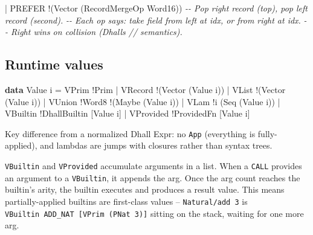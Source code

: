 \documentclass[]{article}
\newenvironment{Shaded}{}{}
\newcommand{\CommentTok}[1]{\textcolor[rgb]{0.38,0.63,0.69}{\textit{#1}}}
\newcommand{\DataTypeTok}[1]{\textcolor[rgb]{0.56,0.13,0.00}{#1}}
\newcommand{\KeywordTok}[1]{\textcolor[rgb]{0.00,0.44,0.13}{\textbf{#1}}}
\newcommand{\NormalTok}[1]{#1}
\newcommand{\OperatorTok}[1]{\textcolor[rgb]{0.40,0.40,0.40}{#1}}
\newcommand{\OtherTok}[1]{\textcolor[rgb]{0.00,0.44,0.13}{#1}}
\begin{document}
\begin{Shaded}
\begin{Highlighting}[]
    \OperatorTok{|} \DataTypeTok{PREFER} \OperatorTok{!}\NormalTok{(}\DataTypeTok{Vector}\NormalTok{ (}\DataTypeTok{RecordMergeOp} \DataTypeTok{Word16}\NormalTok{))}
    \CommentTok{{-}{-} Pop right record (top), pop left record (second).}
    \CommentTok{{-}{-} Each op says: take field from left at idx, or from right at idx.}
    \CommentTok{{-}{-} Right wins on collision (Dhall\textquotesingle{}s // semantics).}
\end{Highlighting}
\end{Shaded}

\subsection{Runtime values}\label{runtime-values}

\begin{Shaded}
\begin{Highlighting}[]
\KeywordTok{data} \DataTypeTok{Value}\NormalTok{ i}
    \OtherTok{=} \DataTypeTok{VPrim} \OperatorTok{!}\DataTypeTok{Prim}
    \OperatorTok{|} \DataTypeTok{VRecord} \OperatorTok{!}\NormalTok{(}\DataTypeTok{Vector}\NormalTok{ (}\DataTypeTok{Value}\NormalTok{ i))}
    \OperatorTok{|} \DataTypeTok{VList} \OperatorTok{!}\NormalTok{(}\DataTypeTok{Vector}\NormalTok{ (}\DataTypeTok{Value}\NormalTok{ i))}
    \OperatorTok{|} \DataTypeTok{VUnion} \OperatorTok{!}\DataTypeTok{Word8} \OperatorTok{!}\NormalTok{(}\DataTypeTok{Maybe}\NormalTok{ (}\DataTypeTok{Value}\NormalTok{ i))}
    \OperatorTok{|} \DataTypeTok{VLam} \OperatorTok{!}\NormalTok{i (}\DataTypeTok{Seq}\NormalTok{ (}\DataTypeTok{Value}\NormalTok{ i))}
    \OperatorTok{|} \DataTypeTok{VBuiltin} \OperatorTok{!}\DataTypeTok{DhallBuiltin}\NormalTok{ [}\DataTypeTok{Value}\NormalTok{ i]}
    \OperatorTok{|} \DataTypeTok{VProvided} \OperatorTok{!}\DataTypeTok{ProvidedFn}\NormalTok{ [}\DataTypeTok{Value}\NormalTok{ i]}
\end{Highlighting}
\end{Shaded}

Key difference from a normalized Dhall Expr: no \texttt{App} (everything is
fully-applied), and lambdas are jumps with closures rather than syntax trees.

\texttt{VBuiltin} and \texttt{VProvided} accumulate arguments in a list. When a
\texttt{CALL} provides an argument to a \texttt{VBuiltin}, it appends the arg.
Once the arg count reaches the builtin's arity, the builtin executes and
produces a result value. This means partially-applied builtins are first-class
values -- \texttt{Natural/add\ 3} is
\texttt{VBuiltin\ ADD\_NAT\ {[}VPrim\ (PNat\ 3){]}} sitting on the stack,
waiting for one more arg.
\end{document}
